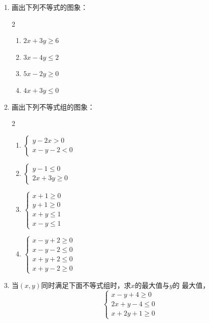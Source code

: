
\begin{enumerate}
    \item 画出下列不等式的图象：
\begin{multicols}{2}
    \begin{enumerate}
        \item $2x+3y\ge 6$
        \item $3x-4y\le 2$
        \item $5x-2y\ge 0$
        \item $4x+3y\le 0$
    \end{enumerate}
\end{multicols}

 \item 画出下列不等式组的图象：
 \begin{multicols}{2}
    \begin{enumerate}
        \item $\begin{cases}
            y-2x>0\\x-y-2<0
        \end{cases}$
        \item $\begin{cases}
            y-1\le 0\\2x+3y\ge 0
        \end{cases}$
        \item $\begin{cases}
            x+1\ge 0\\y+1\ge 0\\x+y\le 1\\ x-y\le 1
        \end{cases}$
        
        \item $\begin{cases}
            x-y+2\ge 0\\x-y-2\le 0\\x+y+2\le 0\\x+y-2\ge 0
        \end{cases}$
    \end{enumerate}
\end{multicols}

\item 当$(x,y)$同时满足下面不等式组时，求$x$的最大值与$y$的
    最大值，
    \[\begin{cases}
     x-y+4\ge 0\\
2x+y-4\le 0\\
x+2y+1\ge 0       
    \end{cases}\]


\end{enumerate}
